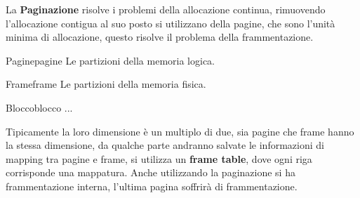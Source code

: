 \documentclass[12pt]{article}
\begin{document}
La \textbf{Paginazione} risolve i problemi della allocazione continua, rimuovendo l'allocazione contigua al suo posto si utilizzano della pagine, che sono l'unit\`a minima di allocazione, questo risolve il problema della frammentazione.
\begin{definition}{Pagine}{pagine}
  Le partizioni della memoria logica.
\end{definition}
\begin{definition}{Frame}{frame}
  Le partizioni della memoria fisica.
\end{definition}
\begin{definition}{Blocco}{blocco}
  ...
\end{definition}
Tipicamente la loro dimensione \`e un multiplo di due, sia pagine che frame hanno la stessa dimensione, da qualche parte andranno salvate le informazioni di mapping tra pagine e frame, si utilizza un \textbf{frame table}, dove ogni riga corrisponde una mappatura. Anche utilizzando la paginazione si ha frammentazione interna, l'ultima pagina soffrir\`a di frammentazione.
\end{document}
